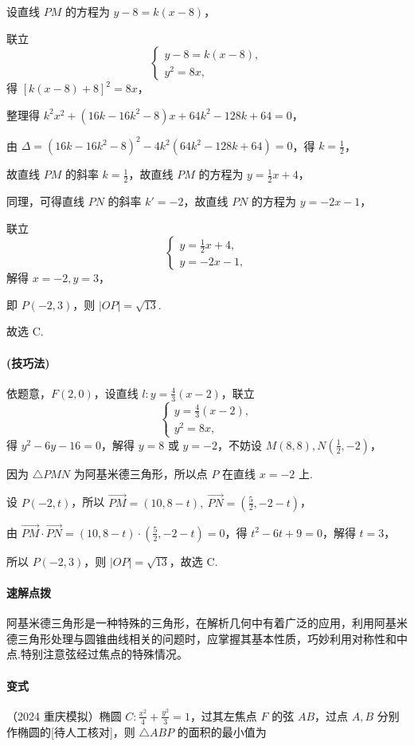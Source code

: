 \documentclass[UTF8,a4paper,11pt]{ctexart}
\begin{document}
设直线 $PM$ 的方程为 $y-8=k(x-8)$，

联立
\[
\begin{cases}
y-8=k(x-8),\\
y^2=8x,
\end{cases}
\]
得 $[k(x-8)+8]^2=8x$，

整理得 $k^2x^2+(16k-16k^2-8)x+64k^2-128k+64=0$，

由 $\Delta=(16k-16k^2-8)^2-4k^2(64k^2-128k+64)=0$，得 $k=\frac{1}{2}$，

故直线 $PM$ 的斜率 $k=\frac{1}{2}$，故直线 $PM$ 的方程为 $y=\frac{1}{2}x+4$，

同理，可得直线 $PN$ 的斜率 $k'=-2$，故直线 $PN$ 的方程为 $y=-2x-1$，

联立
\[
\begin{cases}
y=\frac{1}{2}x+4,\\
y=-2x-1,
\end{cases}
\]
解得 $x=-2,y=3$，

即 $P(-2,3)$，则 $|OP|=\sqrt{13}$.

故选 C.

\paragraph{(技巧法)} 依题意，$F(2,0)$，设直线 $l:y=\frac{4}{3}(x-2)$，联立
\[
\begin{cases}
y=\frac{4}{3}(x-2),\\
y^2=8x,
\end{cases}
\]
得 $y^2-6y-16=0$，解得 $y=8$ 或 $y=-2$，不妨设 $M(8,8),N\left(\frac{1}{2},-2\right)$，

因为 $\triangle PMN$ 为阿基米德三角形，所以点 $P$ 在直线 $x=-2$ 上.

设 $P(-2,t)$，所以 $\overrightarrow{PM}=(10,8-t),\ \overrightarrow{PN}=\left(\frac{5}{2},-2-t\right)$，

由 $\overrightarrow{PM}\cdot\overrightarrow{PN}=(10,8-t)\cdot\left(\frac{5}{2},-2-t\right)=0$，得 $t^2-6t+9=0$，解得 $t=3$，

所以 $P(-2,3)$，则 $|OP|=\sqrt{13}$，故选 C.

\paragraph{速解点拨} 阿基米德三角形是一种特殊的三角形，在解析几何中有着广泛的应用，利用阿基米德三角形处理与圆锥曲线相关的问题时，应掌握其基本性质，巧妙利用对称性和中点.特别注意弦经过焦点的特殊情况。

\paragraph{变式} （2024 重庆模拟）椭圆 $C:\frac{x^2}{4}+\frac{y^2}{3}=1$，过其左焦点 $F$ 的弦 $AB$，过点 $A,B$ 分别作椭圆的[待人工核对]，则 $\triangle ABP$ 的面积的最小值为
\end{document}
